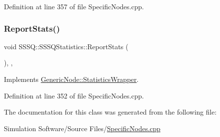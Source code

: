 Definition at line 357 of file Specific\+Nodes.\+cpp.

\mbox{\label{class_s_s_s_q_1_1_s_s_s_q_statistics_ab53eda9d3355dec31021cbdba9333c85}} 
\subsubsection{\texorpdfstring{Report\+Stats()}{ReportStats()}}
{\footnotesize\ttfamily void S\+S\+S\+Q\+::\+S\+S\+S\+Q\+Statistics\+::\+Report\+Stats (\begin{DoxyParamCaption}{ }\end{DoxyParamCaption})\hspace{0.3cm}{\ttfamily [inline]}, {\ttfamily [override]}, {\ttfamily [virtual]}}



Implements \hyperlink{class_generic_node_1_1_statistics_wrapper_a280ae59c2d5f64be5848335dc1b77c21}{Generic\+Node\+::\+Statistics\+Wrapper}.



Definition at line 352 of file Specific\+Nodes.\+cpp.



The documentation for this class was generated from the following file\+:\begin{DoxyCompactItemize}
\item 
Simulation Software/\+Source Files/\hyperlink{_specific_nodes_8cpp}{Specific\+Nodes.\+cpp}\end{DoxyCompactItemize}
